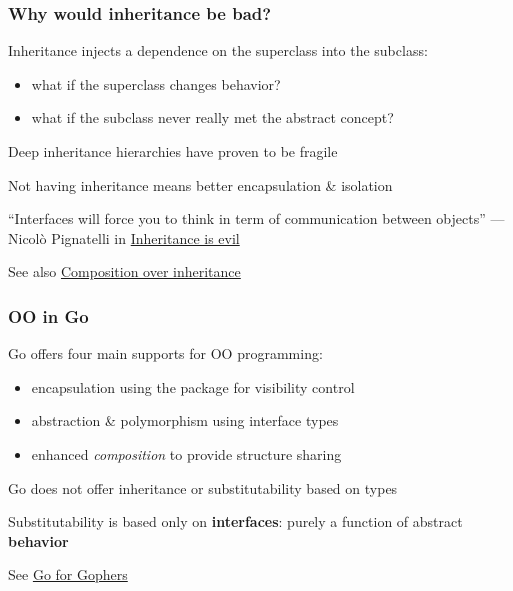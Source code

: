 \documentclass[handout,compress,t,11pt]{beamer}
\begin{document}
\begin{frame}[fragile]
    \frametitle{Why would inheritance be bad?}
    Inheritance injects a dependence on the superclass into the subclass:
    \begin{itemize}
        \item what if the superclass changes behavior?
        \item what if the subclass never really met the abstract concept?
    \end{itemize}
    \vspace{\baselineskip}
    Deep inheritance hierarchies have proven to be fragile \par
    \vspace{\baselineskip}
    Not having inheritance means better encapsulation \& isolation \par
    \vspace{1.6\baselineskip}
    ``Interfaces will force you to think in term of communication between objects'' --- Nicolò Pignatelli
    in \href{https://codeburst.io/inheritance-is-evil-stop-using-it-6c4f1caf5117}{Inheritance is evil} \par
    \vspace{0.4\baselineskip}
    See also \href{https://en.wikipedia.org/wiki/Composition_over_inheritance}%
    {Composition over inheritance}
\end{frame}

\begin{frame}[fragile]
    \frametitle{OO in Go}
    Go offers four main supports for OO programming:
    \begin{itemize}
        \item encapsulation using the package for visibility control
        \item abstraction \& polymorphism using interface types
        \item enhanced {\em composition} to provide structure sharing
    \end{itemize}
    \vspace{\baselineskip}
    Go does not offer inheritance or substitutability based on types \par
    \vspace{\baselineskip}
    Substitutability is based only on {\bf interfaces}: purely a function of 
    abstract {\bf behavior} \par
    \vspace{2\baselineskip}
    See \href{http://talks.golang.org/2014/go4gophers.slide#1}{Go for Gophers}
\end{frame}
\end{document}
